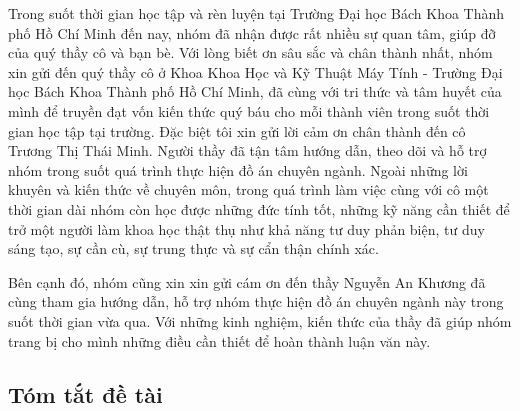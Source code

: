 \documentclass[a4paper, oneside, 12pt]{report}
\theoremstyle{definition}
\begin{document}
	Trong suốt thời gian học tập và rèn luyện tại Trường Đại học Bách Khoa Thành phố Hồ Chí Minh đến nay, nhóm đã nhận được rất nhiều sự quan tâm, giúp đỡ của quý thầy cô và bạn bè. Với lòng biết ơn sâu sắc và chân thành nhất, nhóm xin gửi đến quý thầy cô ở Khoa Khoa Học và Kỹ Thuật Máy Tính - Trường Đại học Bách Khoa Thành phố Hồ Chí Minh, đã cùng với tri thức và tâm huyết của mình để truyền đạt vốn kiến thức quý báu cho mỗi thành viên trong suốt thời gian học tập tại trường. Đặc biệt tôi xin gửi lời cảm ơn chân thành đến cô Trương Thị Thái Minh. Người thầy đã tận tâm hướng dẫn, theo dõi và hỗ trợ nhóm trong suốt quá trình thực hiện đồ án chuyên ngành. Ngoài những lời khuyên và kiến thức về chuyên môn, trong quá trình làm việc cùng với cô một thời gian dài nhóm còn học được những đức tính tốt, những kỹ năng cần thiết để trở một người làm khoa học thật thụ như khả năng tư duy phản biện, tư duy sáng tạo, sự cần cù, sự trung thực và sự cẩn thận chính xác.
	
	Bên cạnh đó, nhóm cũng xin xin gửi cám ơn đến thầy Nguyễn An Khương đã cùng tham gia hướng dẫn, hỗ trợ nhóm thực hiện đồ án chuyên ngành này trong suốt thời gian vừa qua. Với những kinh nghiệm, kiến thức của thầy đã giúp nhóm trang bị cho mình những điều cần thiết để hoàn thành luận văn này. 


\setlength{\parskip}{0mm}

\newpage

\setlength{\parskip}{2.5mm}
\thispagestyle{plain}
	\begin{center}
		\section*{Tóm tắt đề tài}
	\end{center}
	
\end{document}
